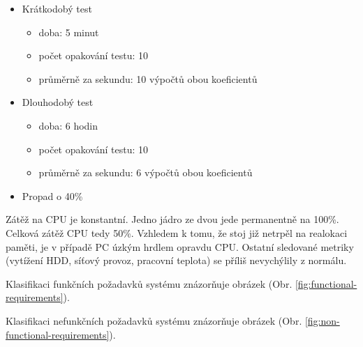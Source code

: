 \begin{itemize}
	\setlength{\parskip}{0pt}
	\setlength{\itemsep}{0pt}
	\item {Krátkodobý test}
	\begin{itemize}
		\setlength{\parskip}{0pt}
		\setlength{\itemsep}{0pt}
		\item {doba: 5 minut}
		\item {počet opakování testu: 10}
		\item {průměrně za sekundu: 10 výpočtů obou koeficientů}
	\end{itemize}
	\item {Dlouhodobý test}
	\begin{itemize}
		\setlength{\parskip}{0pt}
		\setlength{\itemsep}{0pt}
		\item {doba: 6 hodin}
		\item {počet opakování testu: 10}
		\item {průměrně za sekundu: 6 výpočtů obou koeficientů}
	\end{itemize}
	\item {Propad o 40\%}
\end{itemize}

Zátěž na CPU je konstantní. Jedno jádro ze dvou jede permanentně na 100\%. Celková zátěž CPU tedy 50\%. Vzhledem k tomu, že stoj již netrpěl na realokaci paměti, je v případě PC úzkým hrdlem opravdu CPU. Ostatní sledované metriky (vytížení HDD, síťový provoz, pracovní teplota) se příliš nevychýlily z normálu.












Klasifikaci funkčních požadavků systému znázorňuje obrázek (Obr. \ref{fig:functional-requirements}).

Klasifikaci nefunkčních požadavků systému znázorňuje obrázek (Obr. \ref{fig:non-functional-requirements}).


